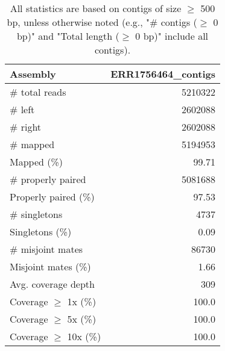 \documentclass[12pt,a4paper]{article}
\begin{document}
\begin{table}[ht]
\begin{center}
\caption{All statistics are based on contigs of size $\geq$ 500 bp, unless otherwise noted (e.g., "\# contigs ($\geq$ 0 bp)" and "Total length ($\geq$ 0 bp)" include all contigs).}
\begin{tabular}{|l*{1}{|r}|}
\hline
Assembly & ERR1756464\_contigs \\ \hline
\# total reads & 5210322 \\ \hline
\# left & 2602088 \\ \hline
\# right & 2602088 \\ \hline
\# mapped & 5194953 \\ \hline
Mapped (\%) & 99.71 \\ \hline
\# properly paired & 5081688 \\ \hline
Properly paired (\%) & 97.53 \\ \hline
\# singletons & 4737 \\ \hline
Singletons (\%) & 0.09 \\ \hline
\# misjoint mates & 86730 \\ \hline
Misjoint mates (\%) & 1.66 \\ \hline
Avg. coverage depth & 309 \\ \hline
Coverage $\geq$ 1x (\%) & 100.0 \\ \hline
Coverage $\geq$ 5x (\%) & 100.0 \\ \hline
Coverage $\geq$ 10x (\%) & 100.0 \\ \hline
\end{tabular}
\end{center}
\end{table}
\end{document}
